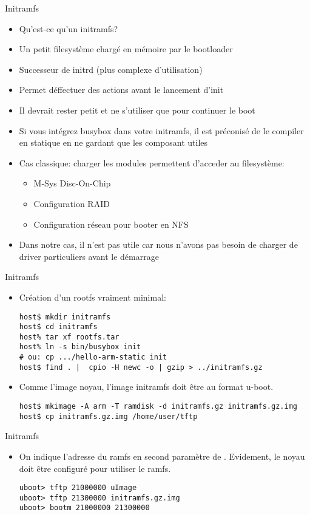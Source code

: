 \begin{frame}[fragile=singleslide]{Initramfs}
  \begin{itemize}
  \item Qu'est-ce qu'un initramfs?
  \item Un petit filesystème chargé en mémoire par le bootloader
  \item Successeur de initrd (plus complexe d'utilisation)
  \item Permet déffectuer des actions avant le lancement d'init
  \item Il devrait rester petit et ne s'utiliser que pour continuer le
    boot
  \item  Si  vous  intégrez  busybox  dans  votre  initramfs,  il  est
    préconisé  de  le compiler  en  statique  en  ne gardant  que  les
    composant utiles
  \item  Cas classique:  charger les  modules permettent  d'acceder au
    filesystème:
    \begin{itemize}
    \item M-Sys Disc-On-Chip
    \item Configuration RAID
    \item Configuration réseau pour booter en NFS
    \end{itemize}
  \item Dans notre cas, il n'est pas utile car nous n'avons pas besoin
    de charger de driver particuliers avant le démarrage
  \end{itemize}
\end{frame}

\begin{frame}[fragile=singleslide]{Initramfs}
  \begin{itemize}
  \item Création d'un rootfs vraiment minimal:
    \begin{lstlisting}
host$ mkdir initramfs
host$ cd initramfs
host% tar xf rootfs.tar
host% ln -s bin/busybox init
# ou: cp .../hello-arm-static init
host$ find . |  cpio -H newc -o | gzip > ../initramfs.gz
    \end{lstlisting}
  \item Comme l'image noyau, l'image initramfs doit être au format u-boot.
    \begin{lstlisting}
host$ mkimage -A arm -T ramdisk -d initramfs.gz initramfs.gz.img
host$ cp initramfs.gz.img /home/user/tftp
    \end{lstlisting}
  \end{itemize}
\end{frame}

\begin{frame}[fragile=singleslide]{Initramfs}
  \begin{itemize}
  \item  On  indique  l'adresse   du  ramfs  en  second  paramètre  de
    . Evidement, le noyau doit être configuré pour utiliser
    le ramfs.
    \begin{lstlisting}
uboot> tftp 21000000 uImage
uboot> tftp 21300000 initramfs.gz.img
uboot> bootm 21000000 21300000
    \end{lstlisting}
  \end{itemize}
\end{frame}
